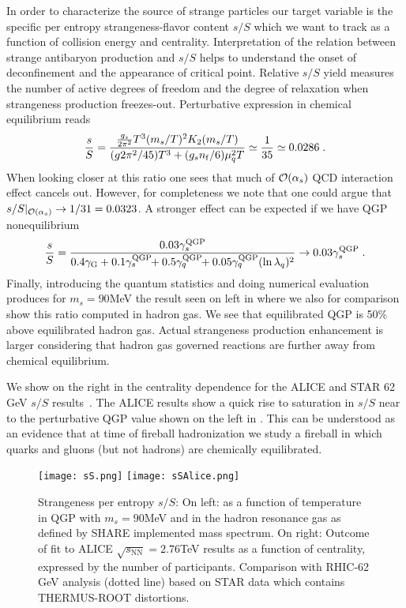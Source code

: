 \documentclass{appolb}
\begin{document}
In order to characterize the source of strange particles our target variable is the specific per entropy strangeness-flavor content $s/S$ which we want to track as a function of collision energy and centrality. Interpretation of the relation between strange antibaryon production and $s/S$ helps to understand the onset of deconfinement and the appearance of critical point.
Relative $s/S$ yield measures the number of active degrees of freedom and the degree of relaxation when strangeness production freezes-out. Perturbative expression in chemical equilibrium reads 
\begin{equation}
{s \over S}=\frac{{g_s\over 2\pi^2} T^3 (m_{ s}/T)^2K_2(m_{ s}/T)}
 {(g2\pi^2/ 45) T^3 +(g_s n_{\rm f}/6)\mu_q^2T}\simeq \frac{1}{35}\simeq 0.0286\;.
\end{equation}
When looking closer at this ratio one sees that much of ${\cal O}(\alpha_s)$ QCD interaction effect cancels out. However, for completeness we note that one could argue that $s/S|_{{\cal O}(\alpha_s)}\to 1/31=0.0323$. A stronger effect can be expected if we have QGP nonequilibrium
\begin{equation}
{s \over S}= { {0.03 \gamma_s^{\rm QGP}} \over 
 {0.4 \gamma_{\rm G} + 
 0.1 \gamma_s^{\rm QGP}\!\!+
 0.5\gamma_q^{\rm QGP}\!\! + 
 0.05 \gamma_q^{\rm QGP} (\ln \lambda_q)^2}}\to 0.03\gamma_s^{\rm QGP}\;.
\end{equation}
Finally, introducing the quantum statistics and doing numerical evaluation produces for $m_s=90$\;MeV the result seen on left in  where we also for comparison show this ratio computed in hadron gas. We see that equilibrated QGP is 50\% above equilibrated hadron gas. Actual strangeness production enhancement is larger considering that hadron gas governed reactions are further away from chemical equilibrium. 

We show on the right in  the centrality dependence for the ALICE and STAR 62 GeV $s/S$ results~\cite{Petran:2013lja}. The ALICE results show a quick rise to saturation in $s/S$ near to the perturbative QGP value shown on the left in . This can be understood as an evidence that at time of fireball hadronization we study a fireball in which quarks and gluons (but not hadrons) are chemically equilibrated.

\begin{figure}[!ht]
\centering
\texttt{[image: sS.png]}
\texttt{[image: sSAlice.png]}
\caption{Strangeness per entropy $s/S$: On left: as a function of temperature in QGP with $m_s=90$\;MeV and in the hadron resonance gas as defined by SHARE implemented mass spectrum. On right: Outcome of fit to ALICE $\sqrt{s_\mathrm{NN}}=2.76$\;TeV results as a function of centrality, expressed by the number of participants. Comparison with RHIC-62 GeV analysis (dotted line) based on STAR data which contains THERMUS-ROOT distortions.}
\label{sSFig}
\end{figure}
\end{document}
